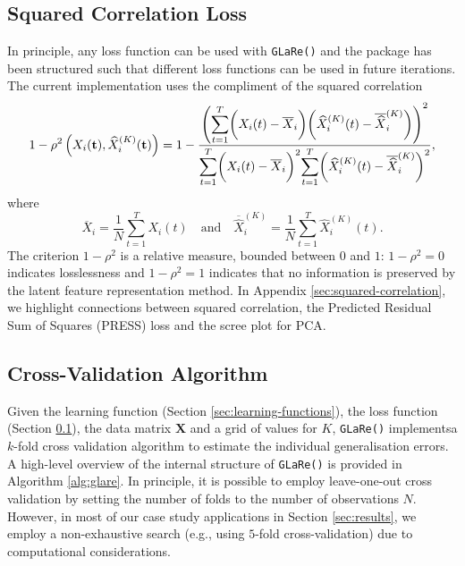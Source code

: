 \subsection{Squared Correlation Loss}\label{sec:loss-functions}

In principle, any loss function can be used with \texttt{GLaRe()} and the package has been structured such that different loss functions can be used in future iterations.
The current implementation uses the compliment of the squared correlation
$$
1- \rho^2 \left(X_i (\mathbf{t}), \widehat{X}^{(K)}_{i} (\mathbf{t}) \right) =
1 - \frac{\left( \mathlarger{\sum}_{t = 1}^T{\bigg(X_i (t) - \overline{X}_i \bigg) \bigg( \widehat{X}_i^{(K)} (t) - \overline{\widehat{X}}_i^{(K)} \bigg)} \right)^2}{\mathlarger{\sum}_{t = 1}^T \bigg(X_i (t) - \overline{X}_i \bigg)^2 \mathlarger{\sum}_{t = 1}^T \bigg( \widehat{X}_i^{(K)} (t) - \overline{\widehat{X}}_i^{(K)} \bigg) ^2},
$$
where
$$
\overline{X}_i = \frac{1}{N} \sum_{t=1}^T X_i (t) \quad \text{and} \quad \overline{\widehat{X}}_i^{(K)} = \frac{1}{N} \sum_{t=1}^T \widehat{X}_i^{(K)} (t).
$$
The criterion $1- \rho^2$ is a relative measure, bounded between $0$ and $1$: $1- \rho^2 = 0$ indicates losslessness and $1- \rho^2 = 1$ indicates that no information is preserved by the latent feature representation method.
In Appendix \ref{sec:squared-correlation}, we highlight connections between squared correlation, the Predicted Residual Sum of Squares (PRESS) loss and the scree plot for PCA.

\subsection{Cross-Validation Algorithm}

Given the learning function (Section \ref{sec:learning-functions}), the loss function (Section \ref{sec:loss-functions}), the data matrix $\mathbf{X}$ and a grid of values for $K$, \texttt{GLaRe()} implementsa $k$-fold cross validation algorithm to estimate the individual generalisation errors. 
A high-level overview of the internal structure of \texttt{GLaRe()} is provided in Algorithm \ref{alg:glare}.
In principle, it is possible to employ leave-one-out cross validation by setting the number of folds to the number of observations $N$.
However, in most of our case study applications in Section \ref{sec:results}, we employ a non-exhaustive search (e.g., using $5$-fold cross-validation) due to computational considerations.



